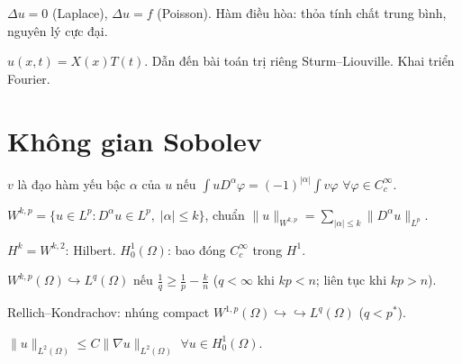 \documentclass[12pt,a4paper]{article}
\begin{document}
\begin{dinhnghia}[title={Phương trình Laplace và Poisson}]
  $\Delta u = 0$ (Laplace), $\Delta u = f$ (Poisson). Hàm điều hòa: thỏa tính chất trung bình, nguyên lý cực đại.
\end{dinhnghia}

\begin{phuongphap}[title={Tách biến (Fourier)}]
  $u(x, t) = X(x)T(t)$. Dẫn đến bài toán trị riêng Sturm--Liouville. Khai triển Fourier.
\end{phuongphap}

\section{Không gian Sobolev}

\begin{dinhnghia}[title={Đạo hàm yếu}]
  $v$ là đạo hàm yếu bậc $\alpha$ của $u$ nếu $\int u D^\alpha\varphi = (-1)^{|\alpha|}\int v\varphi$ $\forall \varphi \in C_c^\infty$.
\end{dinhnghia}

\begin{dinhnghia}[title={Không gian $W^{k,p}(\Omega)$}]
  $W^{k,p} = \{u \in L^p : D^\alpha u \in L^p,\; |\alpha| \le k\}$, chuẩn $\|u\|_{W^{k,p}} = \sum_{|\alpha| \le k}\|D^\alpha u\|_{L^p}$.

  $H^k = W^{k,2}$: Hilbert. $H^1_0(\Omega)$: bao đóng $C_c^\infty$ trong $H^1$.
\end{dinhnghia}

\begin{dinhly}[title={Nhúng Sobolev}]
  $W^{k,p}(\Omega) \hookrightarrow L^q(\Omega)$ nếu $\frac{1}{q} \ge \frac{1}{p} - \frac{k}{n}$ ($q < \infty$ khi $kp < n$; liên tục khi $kp > n$).

  Rellich--Kondrachov: nhúng compact $W^{1,p}(\Omega) \hookrightarrow\hookrightarrow L^q(\Omega)$ ($q < p^*$).
\end{dinhly}

\begin{dinhly}[title={Bất đẳng thức Poincaré}]
  $\|u\|_{L^2(\Omega)} \le C\|\nabla u\|_{L^2(\Omega)}$ $\forall u \in H^1_0(\Omega)$.
\end{dinhly}

\end{document}

